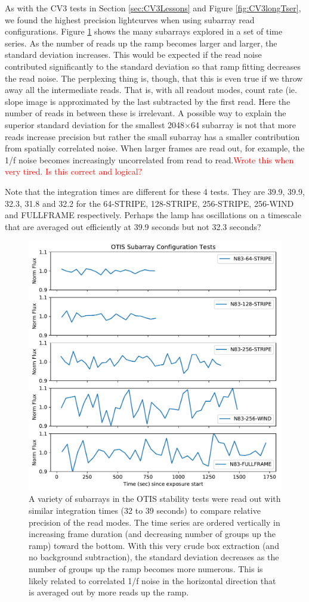 \documentclass{aastex62}
\begin{document}
{As with the CV3 tests in Section \ref{sec:CV3Lessons} and Figure \ref{fig:CV3longTser}, we found the highest precision lightcurves when using subarray read configurations.
Figure \ref{fig:OTISsubarrays} shows the many subarrays explored in a set of time series.
As the number of reads up the ramp becomes larger and larger, the standard deviation increases.
This would be expected if the read noise contributed significantly to the standard deviation so that ramp fitting decreases the read noise.
The perplexing thing is, though, that this is even true if we throw away all the intermediate reads.
That is, with all readout modes, count rate (ie. slope image is approximated by the last subtracted by the first read.
Here the number of reads in between these is irrelevant.
A possible way to explain the superior standard deviation for the smallest 2048$\times$64 subarray is not that more reads increase precision but rather the small subarray has a smaller contribution from spatially correlated noise.
When larger frames are read out, for example, the 1/f noise becomes increasingly uncorrelated from read to read.\textcolor{red}{Wrote this when very tired. Is this correct and logical?}

Note that the integration times are different for these 4 tests. They are 39.9, 39.9, 32.3, 31.8 and 32.2 for the 64-STRIPE, 128-STRIPE, 256-STRIPE, 256-WIND and FULLFRAME respectively. Perhaps the lamp has oscillations on a timescale that are averaged out efficiently at 39.9 seconds but not 32.3 seconds?

\begin{figure}[!hbtp]
\centering
\includegraphics[width=.5\columnwidth]{subarray_config_tser.pdf}
\caption{A variety of subarrays in the OTIS stability tests were read out with similar integration times (32 to 39 seconds) to compare relative precision of the read modes. 
The time series are ordered vertically in increasing frame duration (and decreasing number of groups up the ramp) toward the bottom.
With this very crude box extraction (and no background subtraction), the standard deviation decreases as the number of groups up the ramp becomes more numerous.
This is likely related to correlated 1/f noise in the horizontal direction that is averaged out by more reads up the ramp.}\label{fig:OTISsubarrays}
\end{figure}

}
\end{document}
